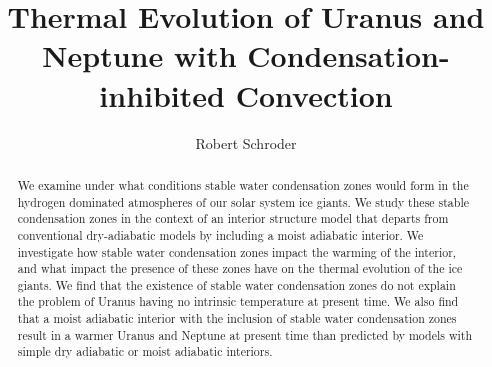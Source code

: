 \documentclass[11pt]{ucscthesisbs}
\begin{document}

\title{Thermal Evolution of Uranus and Neptune with Condensation-inhibited Convection}
\author{Robert Schroder}
%

%





\maketitle
\copyrightpage

\begin{frontmatter}

\begin{abstract}
We examine under what conditions stable water condensation zones would form in the hydrogen dominated atmospheres of our solar system ice giants. We study these stable condensation zones in the context of an interior structure model that departs from conventional dry-adiabatic models by including a moist adiabatic interior. We investigate how stable water condensation zones impact the warming of the interior, and what impact the presence of these zones have on the thermal evolution of the ice giants. We find that the existence of stable water condensation zones do not explain the problem of Uranus having no intrinsic temperature at present time. We also find that a moist adiabatic interior with the inclusion of stable water condensation zones result in a warmer Uranus and Neptune at present time than predicted by models with simple dry adiabatic or moist adiabatic interiors.
\end{abstract}

\tableofcontents
%
%
\listoffigures


\end{frontmatter}
\end{document}
